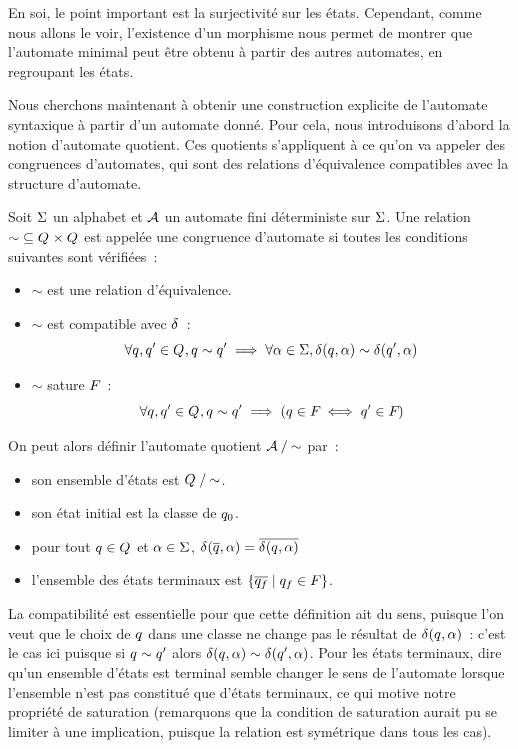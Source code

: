 \begin{remark}
  En soi, le point important est la surjectivité sur les états. Cependant, comme
  nous allons le voir, l'existence d'un morphisme nous permet de montrer que
  l'automate minimal peut être obtenu à partir des autres automates, en
  regroupant les états.
\end{remark}

Nous cherchons maintenant à obtenir une construction explicite de l'automate
syntaxique à partir d'un automate donné. Pour cela, nous introduisons d'abord la
notion d'automate quotient. Ces quotients s'appliquent à ce qu'on va appeler des
congruences d'automates, qui sont des relations d'équivalence compatibles avec
la structure d'automate.

\begin{definition}
  Soit $\Sigma$ un alphabet et $\mathcal{A}$ un automate fini déterministe sur $\Sigma$.
  Une relation $\mathord{\sim} \subseteq Q_{} \times Q_{}$ est appelée une
  congruence d'automate si toutes les conditions suivantes sont vérifiées~:
  \begin{itemize}
  \item $\sim$ est une relation d'équivalence.
  \item $\sim$ est compatible avec $\delta_{}$~:
    \[\forall q_{},q_{}' \in Q_{}, q_{} \sim q_{}' \implies
    \forall \alpha \in \Sigma, \delta_{}(q_{},\alpha) \sim \delta_{}(q_{}',\alpha)\]
  \item $\sim$ sature $F_{}$~:
    \[\forall q_{},q_{}' \in Q_{}, q_{} \sim q_{}' \implies
    (q_{} \in F_{} \iff q_{}' \in F_{})\]
  \end{itemize}

  On peut alors définir l'automate quotient $\mathord{\mathcal{A}}\mathbin{/}\mathord{\sim}$ par~:
  \begin{itemize}
  \item son ensemble d'états est $\mathord{Q_{}}\mathbin{/}\mathord{\sim}$.
  \item son état initial est la classe de $q_{0}$.
  \item pour tout $q_{} \in Q_{}$ et $\alpha \in \Sigma$,
    $\delta_{}(\overline{q_{}},\alpha)=\overline{\delta_{}(q_{},\alpha)}$
  \item l'ensemble des états terminaux est
    $\left\{ \overline{q_{f}} \;\middle\vert\; q_{f} \in F \right\}$.
  \end{itemize}
\end{definition}

\begin{remark}
  La compatibilité est essentielle pour que cette définition ait du sens,
  puisque l'on veut que le choix de $q_{}$ dans une classe ne change pas le
  résultat de $\delta_{}(q_{},\alpha)$~: c'est le cas ici puisque si
  $q_{}\sim q_{}'$ alors $\delta_{}(q_{},\alpha) \sim \delta_{}(q_{}',\alpha)$. Pour
  les états terminaux, dire qu'un ensemble d'états est terminal semble changer
  le sens de l'automate lorsque l'ensemble n'est pas constitué que d'états
  terminaux, ce qui motive notre propriété de saturation (remarquons que la
  condition de saturation aurait pu se limiter à une implication, puisque la
  relation est symétrique dans tous les cas).
\end{remark}

